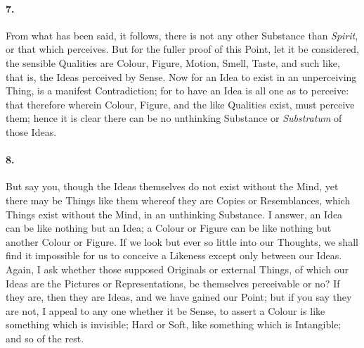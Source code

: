 \documentclass[]{article}
\newenvironment{sectionbody}{}{}
\begin{document}
\begin{sectionbody}
\paragraph{7.} From what has been said, it follows, there is not any other
Substance than \emph{Spirit}, or that which perceives.  But for
the fuller proof of this Point, let it be considered, the
sensible Qualities are Colour, Figure, Motion, Smell, Taste, and
such like, that is, the Ideas perceived by Sense.  Now for an
Idea to exist in an unperceiving Thing, is a manifest
Contradiction; for to have an Idea is all one as to perceive:
that therefore wherein Colour, Figure, and the like Qualities
exist, must perceive them; hence it is clear there can be no
unthinking Substance or \emph{Substratum} of those Ideas.



\paragraph{8.} But say you, though the Ideas themselves do not exist without the
Mind, yet there may be Things like them whereof they are Copies
or Resemblances, which Things exist without the Mind, in an
unthinking Substance.  I answer, an Idea can be like nothing but
an Idea; a Colour or Figure can be like nothing but another
Colour or Figure.  If we look but ever so little into our
Thoughts, we shall find it impossible for us to conceive a
Likeness except only between our Ideas.  Again, I ask whether
those supposed Originals or external Things, of which our Ideas
are the Pictures or Representations, be themselves perceivable or
no?  If they are, then they are Ideas, and we have gained our
Point; but if you say they are not, I appeal to any one whether
it be Sense, to assert a Colour is like something which is
invisible; Hard or Soft, like something which is Intangible; and
so of the rest.




\end{sectionbody}
\end{document}
